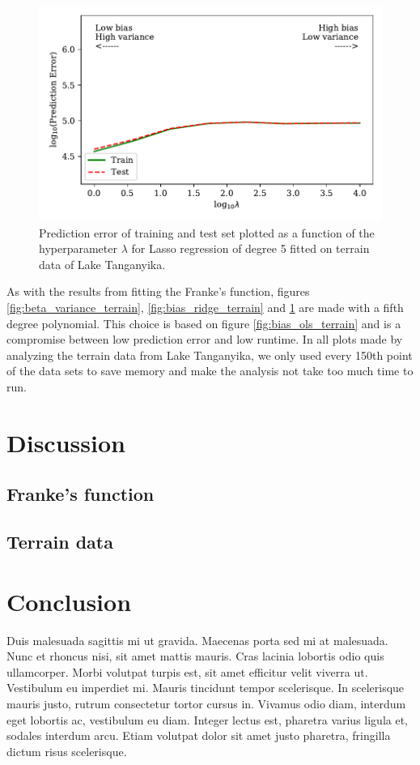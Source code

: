 \documentclass[a4paper, 10pt]{article}
\begin{document}
\begin{figure}[H]
    \includegraphics{figs/biasvariancetradeoff_LASSO_terrain.pdf}
    \caption{Prediction error of training and test set plotted as a function of the hyperparameter $\lambda$ for Lasso regression of degree 5 fitted on terrain data of Lake Tanganyika.}
    \label{fig:bias_lasso_terrain}
\end{figure}
As with the results from fitting the Franke's function, figures \ref{fig:beta_variance_terrain}, \ref{fig:bias_ridge_terrain} and \ref{fig:bias_lasso_terrain} are made with a fifth degree polynomial. This choice is based on figure \ref{fig:bias_ols_terrain} and is a compromise between low prediction error and low runtime. In all plots made by analyzing the terrain data from Lake Tanganyika, we only used every 150th point of the data sets to save memory and make the analysis not take too much time to run.
\begin{multicols}{2}





\section{Discussion}
\subsection{Franke's function}

\subsection{Terrain data}

\section{Conclusion}
Duis malesuada sagittis mi ut gravida. Maecenas porta sed mi at malesuada. Nunc et rhoncus nisi, sit amet mattis mauris. Cras lacinia lobortis odio quis ullamcorper. Morbi volutpat turpis est, sit amet efficitur velit viverra ut. Vestibulum eu imperdiet mi. Mauris tincidunt tempor scelerisque. In scelerisque mauris justo, rutrum consectetur tortor cursus in. Vivamus odio diam, interdum eget lobortis ac, vestibulum eu diam. Integer lectus est, pharetra varius ligula et, sodales interdum arcu. Etiam volutpat dolor sit amet justo pharetra, fringilla dictum risus scelerisque.
\end{multicols}
\end{document}
